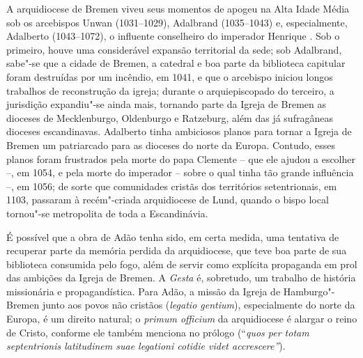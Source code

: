 A arquidiocese de Bremen viveu seus momentos de apogeu na Alta Idade
Média sob os arcebispos Unwan (1031--1029), Adalbrand (1035--1043) e,
especialmente, Adalberto (1043--1072), o influente conselheiro do
imperador Henrique . Sob o primeiro, houve uma considerável expansão
territorial da sede; sob Adalbrand, sabe"-se que a cidade de Bremen, a
catedral e boa parte da biblioteca capitular foram destruídas por um
incêndio, em 1041, e que o arcebispo iniciou longos trabalhos de
reconstrução da igreja; durante o arquiepiscopado do terceiro, a
jurisdição expandiu"-se ainda mais, tornando parte da Igreja de Bremen as
dioceses de Mecklenburgo, Oldenburgo e Ratzeburg, além das já
sufragâneas dioceses escandinavas. Adalberto tinha ambiciosos planos
para tornar a Igreja de Bremen um patriarcado para as dioceses do norte
da Europa. Contudo, esses planos foram frustrados pela morte do papa
Clemente  -- que ele ajudou a escolher --, em 1054, e pela morte do
imperador -- sobre o qual tinha tão grande influência --, em 1056; de
sorte que comunidades cristãs dos territórios setentrionais, em 1103,
passaram à recém"-criada arquidiocese de Lund, quando o bispo local
tornou"-se metropolita de toda a Escandinávia.

É possível que a obra de Adão tenha sido, em certa medida, uma tentativa
de recuperar parte da memória perdida da arquidiocese, que teve boa
parte de sua biblioteca consumida pelo fogo, além de servir como
explícita propaganda em prol das ambições da Igreja de Bremen. A
\emph{Gesta} é, sobretudo, um trabalho de história missionária e
propagandística. Para Adão, a missão da Igreja de Hamburgo"-Bremen junto
aos povos não cristãos (\emph{legatio gentium}), especialmente do norte
da Europa, é um direito natural; o \emph{primum officium} da
arquidiocese é alargar o reino de Cristo, conforme ele também menciona
no prólogo (``\emph{quos per totam septentrionis latitudinem suae
legationi cotidie videt accrescere''}).

